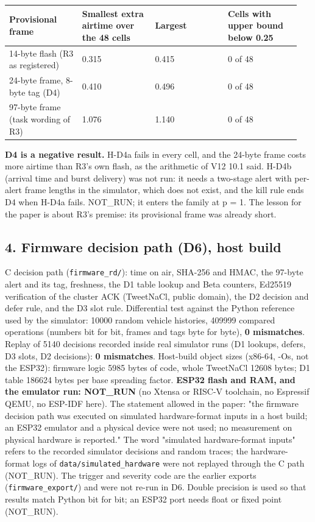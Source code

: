 {\scriptsize\raggedright
\begin{longtable}{p{0.237\linewidth}p{0.237\linewidth}p{0.237\linewidth}p{0.237\linewidth}}
\toprule
Provisional frame & Smallest extra airtime over the 48 cells & Largest & Cells with upper bound below 0.25 \\
\midrule
\endhead
14-byte flash (R3 as registered) & 0.315 & 0.415 & 0 of 48 \\
24-byte frame, 8-byte tag (D4) & 0.410 & 0.496 & 0 of 48 \\
97-byte frame (task wording of R3) & 1.076 & 1.140 & 0 of 48 \\
\bottomrule
\end{longtable}}

\textbf{D4 is a negative result.} H-D4a fails in every cell, and the 24-byte frame costs more airtime than R3's own flash, as the arithmetic of V12 10.1 said. H-D4b (arrival time and burst delivery) was not run: it needs a two-stage alert with per-alert frame lengths in the simulator, which does not exist, and the kill rule ends D4 when H-D4a fails. NOT\_RUN; it enters the family at p = 1. The lesson for the paper is about R3's premise: its provisional frame was already short.

\subsection*{4. Firmware decision path (D6), host build}

C decision path (\texttt{firmware\_rd/}): time on air, SHA-256 and HMAC, the 97-byte alert and its tag, freshness, the D1 table lookup and Beta counters, Ed25519 verification of the cluster ACK (TweetNaCl, public domain), the D2 decision and defer rule, and the D3 slot rule. Differential test against the Python reference used by the simulator: 10000 random vehicle histories, 409999 compared operations (numbers bit for bit, frames and tags byte for byte), \textbf{0 mismatches}. Replay of 5140 decisions recorded inside real simulator runs (D1 lookups, defers, D3 slots, D2 decisions): \textbf{0 mismatches}. Host-build object sizes (x86-64, -Os, not the ESP32): firmware logic 5985 bytes of code, whole TweetNaCl 12608 bytes; D1 table 186624 bytes per base spreading factor. \textbf{ESP32 flash and RAM, and the emulator run: NOT\_RUN} (no Xtensa or RISC-V toolchain, no Espressif QEMU, no ESP-IDF here). The statement allowed in the paper: "the firmware decision path was executed on simulated hardware-format inputs in a host build; an ESP32 emulator and a physical device were not used; no measurement on physical hardware is reported." The word "simulated hardware-format inputs" refers to the recorded simulator decisions and random traces; the hardware-format logs of \texttt{data/simulated\_hardware} were not replayed through the C path (NOT\_RUN). The trigger and severity code are the earlier exports (\texttt{firmware\_export/}) and were not re-run in D6. Double precision is used so that results match Python bit for bit; an ESP32 port needs float or fixed point (NOT\_RUN).

